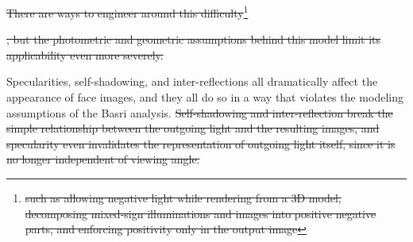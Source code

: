 \documentclass[12pt,journal,draftcls,letterpaper,onecolumn]{IEEEtran}
\providecommand{\DIFdel}[1]{{\protect\color{red}\sout{#1}}}                      %
\providecommand{\DIFdelbegin}{} %
\providecommand{\DIFdelend}{} %
\begin{document}
\DIFdelbegin \DIFdel{There are ways to engineer around this difficulty}\footnote{\DIFdel{such as allowing negative light while rendering from a 3D model, decomposing mixed-sign illuminations and images into positive negative parts, and enforcing positivity only in the output image}}%
\addtocounter{footnote}{-1}%
\DIFdel{, but the photometric and geometric assumptions behind this model limit its applicability even more severely.
}%

\DIFdelend %
Specularities, self-shadowing, and inter-reflections all dramatically affect the appearance of face images,
and they all do so in a way that violates the modeling assumptions of the Basri analysis.
\DIFdelbegin \DIFdel{Self-shadowing and inter-reflection break the simple relationship between the outgoing light
and the resulting images, and specularity even invalidates the representation of outgoing light itself,
since it is no longer independent of viewing angle.
}\DIFdelend %
\end{document}
